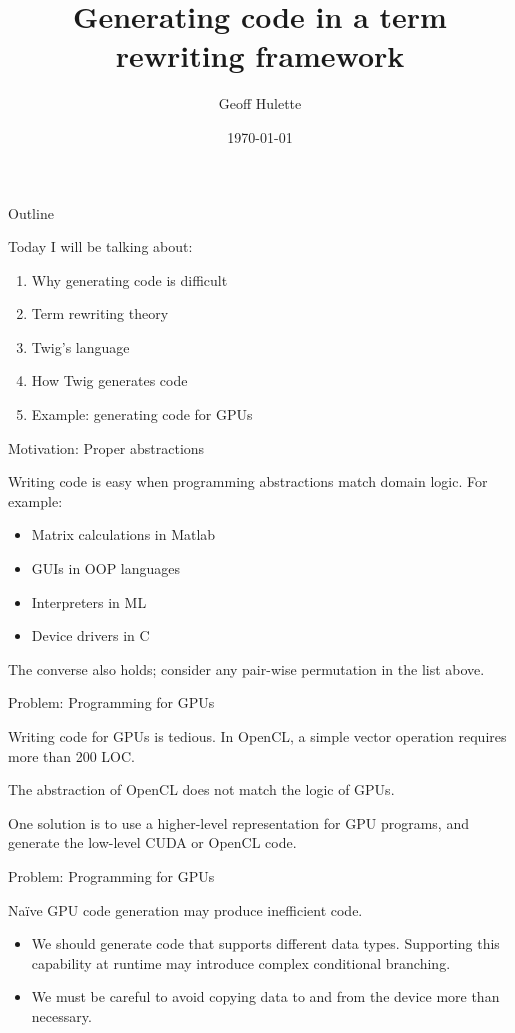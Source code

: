 \documentclass{beamer}
\title{Generating code in a term rewriting framework}
\author{Geoff Hulette}
\date{\today}
\begin{document}
\begin{frame}[plain]
  \titlepage
\end{frame}

\begin{frame}{Outline}

Today I will be talking about:

\begin{enumerate}
  \item Why generating code is difficult
  \item Term rewriting theory
  \item Twig's language
  \item How Twig generates code
  \item Example: generating code for GPUs
\end{enumerate}

\end{frame}


\begin{frame}{Motivation: Proper abstractions}

Writing code is easy when programming abstractions match domain logic. For
example:

\begin{itemize}
\item Matrix calculations in Matlab
\item GUIs in OOP languages
\item Interpreters in ML
\item Device drivers in C
\end{itemize}

The converse also holds; consider any pair-wise permutation in the list above.

\end{frame}


\begin{frame}{Problem: Programming for GPUs}

Writing code for GPUs is tedious. In OpenCL, a simple vector operation
requires more than 200 LOC. 

The abstraction of OpenCL does not match the logic of GPUs.

One solution is to use a higher-level representation for GPU programs, and
generate the low-level CUDA or OpenCL code.

\end{frame}

\begin{frame}{Problem: Programming for GPUs}

Na\"ive GPU code generation may produce inefficient code.

\begin{itemize}

\item We should generate code that supports different data types. Supporting
this capability at runtime may introduce complex conditional branching.

\item We must be careful to avoid copying data to and from the device more
than necessary.

\end{itemize}

\end{frame}
\end{document}
